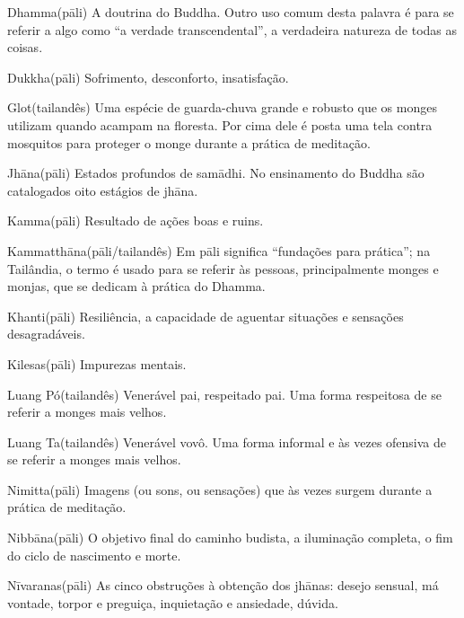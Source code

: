 \begin{glossarydescription}
\item[{{Dhamma}{(pāli)}}] A doutrina do Buddha. Outro uso comum desta palavra é para se referir a algo como ``a verdade transcendental'', a verdadeira natureza de todas as coisas.

\item[{{Dukkha}{(pāli)}}] Sofrimento, desconforto, insatisfação.

\item[{{Glot}{(tailandês)}}] Uma espécie de guarda-chuva grande e robusto que os monges utilizam quando acampam na floresta. Por cima dele é posta uma tela contra mosquitos para proteger o monge durante a prática de meditação.

\item[{{Jhāna}{(pāli)}}] Estados profundos de samādhi. No ensinamento do Buddha são catalogados oito estágios de jhāna.

\item[{{Kamma}{(pāli)}}] Resultado de ações boas e ruins.

\item[{{Kammatthāna}{(pāli/tailandês)}}] Em pāli significa ``fundações para prática''; na Tailândia, o termo é usado para se referir às pessoas, principalmente monges e monjas, que se dedicam à prática do Dhamma.

\item[{{Khanti}{(pāli)}}] Resiliência, a capacidade de aguentar situações e sensações desagradáveis.

\item[{{Kilesas}{(pāli)}}] Impurezas mentais.

\item[{{Luang Pó}{(tailandês)}}] Venerável pai, respeitado pai. Uma forma respeitosa de se referir a monges mais velhos.

\item[{{Luang Ta}{(tailandês)}}] Venerável vovô. Uma forma informal e às vezes ofensiva de se referir a monges mais velhos.

\item[{{Nimitta}{(pāli)}}] Imagens (ou sons, ou sensações) que às vezes surgem durante a prática de meditação.

\item[{{Nibbāna}{(pāli)}}] O objetivo final do caminho budista, a iluminação completa, o fim do ciclo de nascimento e morte.

\item[{{Nīvaranas}{(pāli)}}] As cinco obstruções à obtenção dos jhānas: desejo sensual, má vontade, torpor e preguiça, inquietação e ansiedade, dúvida.


\end{glossarydescription}
